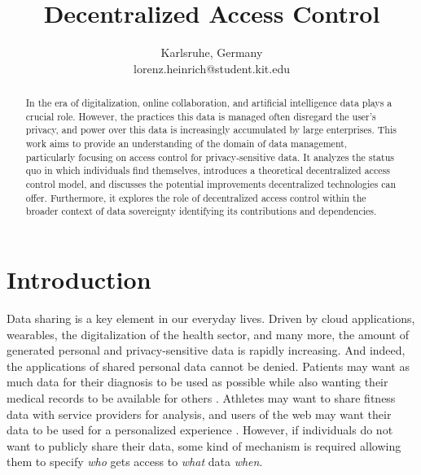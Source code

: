 \documentclass[conference]{IEEEtran}
\begin{document}
\title{Decentralized Access Control}%

\author{
  Karlsruhe, Germany \\
  lorenz.heinrich@student.kit.edu
}

\maketitle

\begin{abstract}
  In the era of digitalization, online collaboration, and artificial intelligence data plays a crucial role.
  However, the practices this data is managed often disregard the user's privacy, and power over this data is increasingly accumulated by large enterprises.
  This work aims to provide an understanding of the domain of data management, particularly focusing on access control for privacy-sensitive data.
  It analyzes the status quo in which individuals find themselves, introduces a theoretical decentralized access control model, and discusses the potential improvements decentralized technologies can offer.
  Furthermore, it explores the role of decentralized access control within the broader context of data sovereignty identifying its contributions and dependencies.
\end{abstract}

\section{Introduction}
Data sharing is a key element in our everyday lives.
Driven by cloud applications, wearables, the digitalization of the health sector, and many more, the amount of generated personal and privacy-sensitive data is rapidly increasing.
And indeed, the applications of shared personal data cannot be denied.
Patients may want as much data for their diagnosis to be used as possible while also wanting their medical records to be available for others \cite{hollis_share_2016}.
Athletes may want to share fitness data with service providers for analysis, and users of the web may want their data to be used for a personalized experience \cite{nasir_council_nodate}.
However, if individuals do not want to publicly share their data, some kind of mechanism is required allowing them to specify \textit{who} gets access to \textit{what} data \textit{when}.
\end{document}

